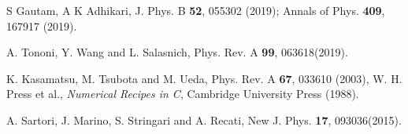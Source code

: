 \documentclass[amsmath,amssymb,lengthcheck,aps,prl] {revtex4}
\begin{document}
\begin{thebibliography}{50}
 S Gautam, A K Adhikari, J. Phys. B {\bf 52}, 055302 (2019); Annals of Phys. {\bf 409}, 167917 (2019).

 A. Tononi, Y. Wang and L. Salasnich, Phys. Rev. A {\bf 99}, 063618(2019).

 K. Kasamatsu, M. Tsubota and M. Ueda, Phys. Rev. A \textbf{67}, 033610 (2003), W. H. Press et al., \textit{Numerical Recipes in C}, Cambridge University Press (1988).

 A. Sartori, J. Marino, S. Stringari and A. Recati, New J. Phys. {\bf 17}, 093036(2015).

\end{thebibliography}
\end{document}
